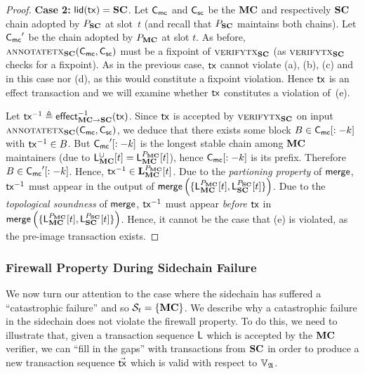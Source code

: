 \begin{proof}
  \textbf{Case 2: } $\llid(\tx) = \Sidechain$.
  Let $\chainmc$ and $\chainsc$ be the $\Mainchain$ and respectively $\Sidechain$ chain
  adopted by $\party_\Sidechain$ at slot~$t$ (and recall that $\party_\Sidechain$ maintains
  both chains). Let $\chainmc'$ be the chain adopted by
  $\party_\Mainchain$ at slot $t$. As before,
  $\textsc{annotatetx}_\Sidechain(\chainmc,\chainsc)$ must be a fixpoint of
  $\textsc{verifytx}_\Sidechain$ (as $\textsc{verifytx}_\Sidechain$ checks for a fixpoint).
  As in the previous case, $\tx$ cannot violate (a), (b), (c) and in this case
  nor (d), as this would constitute a fixpoint violation. Hence $\tx$ is an
  effect transaction and we will examine whether $\tx$ constitutes a violation
  of~(e).

  Let $\tx^{-1} \defeq \eff{\Mainchain}{\Sidechain}^{-1}(\tx)$. Since $\tx$ is accepted
  by $\textsc{verifytx}_\Sidechain$ on input
  $\textsc{annotatetx}_\Sidechain(\chainmc,\chainsc)$, we deduce that
  there exists some block $B \in \chainmc[:-k]$
  with $\tx^{-1} \in B$. But $\chainmc'[:-k]$
  is the longest stable chain among
  $\Mainchain$ maintainers (due to $\LState_\Mainchain^\cup[t] = \LState_\Mainchain^{\party_\Mainchain}[t]$),
  hence $\chainmc[:-k]$ is its prefix. Therefore
  $B \in \chainmc'[:-k]$.
  Hence, $\tx^{-1} \in \Ledger^{\party_\Mainchain}_\Mainchain[t]$.
  Due to the \emph{partioning property} of $\merge$, $\tx^{-1}$ must appear in
  the output of $\merge\left(
      \{\LState_\Mainchain^{\party_\Mainchain}[t], \LState_\Sidechain^{\party_\Sidechain}[t]\}
  \right)$.
  Due to the
  \emph{topological soundness} of $\merge$, $\tx^{-1}$ must appear
  \emph{before} $\tx$
  in
  $\merge\left(
      \{\LState_\Mainchain^{\party_\Mainchain}[t], \LState_\Sidechain^{\party_\Sidechain}[t]\}
  \right)$. Hence, it cannot be the case that (e) is violated, as the pre-image
  transaction exists.
\end{proof}

\subsubsection{Firewall Property During Sidechain Failure}


We now turn our attention to the case where the sidechain has suffered a
``catastrophic failure'' and so $\Secure_t = \{\Mainchain\}$. We describe why a
catastrophic failure in the sidechain does not violate the firewall property. To
do this, we need to illustrate that, given a transaction sequence $\LState$ which is
accepted by the $\Mainchain$ verifier, we can ``fill in the gaps'' with transactions
from $\Sidechain$ in order to produce a new transaction sequence $\vec\tx$ which is
valid with respect to $\adalang$.

